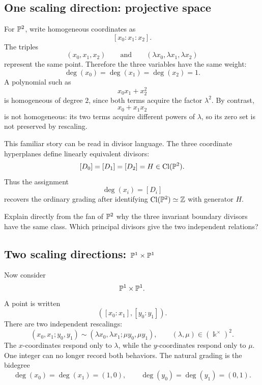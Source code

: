\subsection{One scaling direction: projective space}

For \(\mathbb{P}^2\), write homogeneous coordinates as
\[
[x_0:x_1:x_2].
\]
The triples
\[
(x_0,x_1,x_2)
\qquad\text{and}\qquad
(\lambda x_0,\lambda x_1,\lambda x_2)
\]
represent the same point. Therefore the three variables have the same
weight:
\[
\deg(x_0)=\deg(x_1)=\deg(x_2)=1.
\]
A polynomial such as
\[
x_0x_1+x_2^2
\]
is homogeneous of degree \(2\), since both terms acquire the factor
\(\lambda^2\). By contrast,
\[
x_0+x_1x_2
\]
is not homogeneous: its two terms acquire different powers of
\(\lambda\), so its zero set is not preserved by rescaling.

This familiar story can be read in divisor language. The three
coordinate hyperplanes define linearly equivalent divisors:
\[
[D_0]=[D_1]=[D_2]=H\in\operatorname{Cl}(\mathbb{P}^2).
\]
Thus the assignment
\[
\deg(x_i)=[D_i]
\]
recovers the ordinary grading after identifying \(\operatorname{Cl}(\mathbb{P}^2)\simeq\mathbb{Z}\)
with generator \(H\).

\begin{pauseandthink}
Explain directly from the fan of \(\mathbb{P}^2\) why the three invariant
boundary divisors have the same class. Which principal divisors give
the two independent relations?
\end{pauseandthink}

\subsection{Two scaling directions: \texorpdfstring{\(\mathbb{P}^1\times\mathbb{P}^1\)}{P1 x P1}}

Now consider
\[
\mathbb{P}^1\times\mathbb{P}^1.
\]
A point is written
\[
([x_0:x_1],[y_0:y_1]).
\]
There are two independent rescalings:
\[
(x_0,x_1;y_0,y_1)
\sim
(\lambda x_0,\lambda x_1;\mu y_0,\mu y_1),
\qquad
(\lambda,\mu)\in(\Bbbk^\times)^2.
\]
The \(x\)-coordinates respond only to \(\lambda\), while the
\(y\)-coordinates respond only to \(\mu\). One integer can no longer
record both behaviors. The natural grading is the bidegree
\[
\deg(x_0)=\deg(x_1)=(1,0),
\qquad
\deg(y_0)=\deg(y_1)=(0,1).
\]

